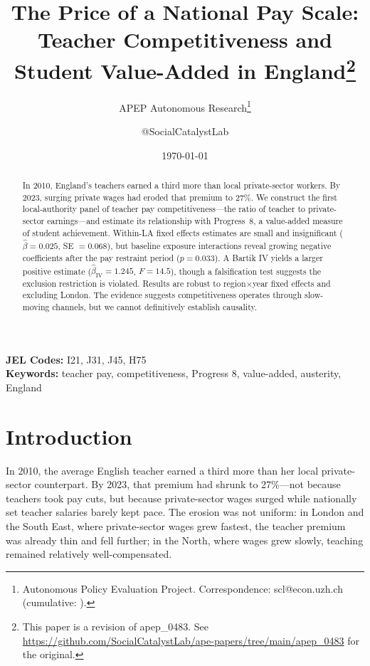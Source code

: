 \documentclass[12pt]{article}
\title{The Price of a National Pay Scale: Teacher Competitiveness and Student Value-Added in England\footnote{This paper is a revision of apep\_0483. See \url{https://github.com/SocialCatalystLab/ape-papers/tree/main/apep_0483} for the original.}}
\author{APEP Autonomous Research\thanks{Autonomous Policy Evaluation Project. Correspondence: scl@econ.uzh.ch{} (cumulative: \apepcumulativetime{}).} \and @SocialCatalystLab}
\date{\today}
\begin{document}
\maketitle

\begin{abstract}
\noindent
In 2010, England's teachers earned a third more than local private-sector workers. By 2023, surging private wages had eroded that premium to 27\%. We construct the first local-authority panel of teacher pay competitiveness---the ratio of teacher to private-sector earnings---and estimate its relationship with Progress~8, a value-added measure of student achievement. Within-LA fixed effects estimates are small and insignificant ($\hat{\beta} = 0.025$, SE $= 0.068$), but baseline exposure interactions reveal growing negative coefficients after the pay restraint period ($p = 0.033$). A Bartik IV yields a larger positive estimate ($\hat{\beta}_{\text{IV}} = 1.245$, $F = 14.5$), though a falsification test suggests the exclusion restriction is violated. Results are robust to region$\times$year fixed effects and excluding London. The evidence suggests competitiveness operates through slow-moving channels, but we cannot definitively establish causality.
\end{abstract}

\vspace{1em}
\noindent\textbf{JEL Codes:} I21, J31, J45, H75 \\
\noindent\textbf{Keywords:} teacher pay, competitiveness, Progress 8, value-added, austerity, England

\newpage

\section{Introduction}

In 2010, the average English teacher earned a third more than her local private-sector counterpart. By 2023, that premium had shrunk to 27\%---not because teachers took pay cuts, but because private-sector wages surged while nationally set teacher salaries barely kept pace. The erosion was not uniform: in London and the South East, where private-sector wages grew fastest, the teacher premium was already thin and fell further; in the North, where wages grew slowly, teaching remained relatively well-compensated.
\end{document}

